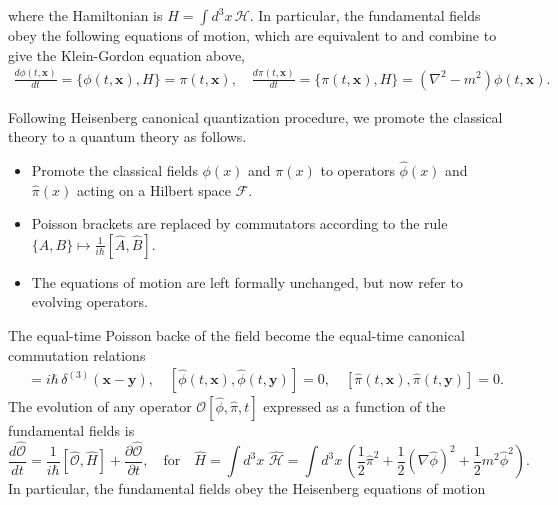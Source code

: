 \documentclass[../QFT_main.tex]{subfiles}
\begin{document}
\begin{mytheorem}
\begin{equation}
\end{equation}
where the Hamiltonian is $H = \int d^3 x\, \mathcal{H}$. 
In particular, the fundamental fields obey the following equations of motion, which are equivalent to and combine to give the Klein-Gordon equation above,
\begin{align}
    \frac{d\phi(t, \mathbf{x})}{dt} = \{\phi(t, \mathbf{x}), H\} = \pi(t, \mathbf{x}), \quad
    \frac{d\pi(t, \mathbf{x})}{dt} = \{\pi(t, \mathbf{x}), H\} = (\nabla^2 - m^2) \phi(t, \mathbf{x}). 
\end{align}
%
\end{mytheorem}


\begin{mytheorem}
%
Following Heisenberg canonical quantization procedure, we promote the classical theory to a quantum theory as follows.
\begin{itemize}
    \item Promote the classical fields $\phi(x)$ and $\pi(x)$ to operators $\hat{\phi}(x)$ and $\hat{\pi}(x)$ acting on a Hilbert space $\mathcal{F}$.
    \item Poisson brackets are replaced by commutators according to the rule $\displaystyle \{A, B\} \mapsto \frac{1}{i\hbar} [\hat{A}, \hat{B}].$
    \item The equations of motion are left formally unchanged, but now refer to evolving operators.
\end{itemize}
%
The equal-time Poisson backe of the field become the equal-time canonical commutation relations
{\small\begin{align}
    [\hat{\phi}(t, \mathbf{x}), \hat{\pi}(t, \mathbf{y})] &= i\hbar\, \delta^{(3)}(\mathbf{x} - \mathbf{y}), \quad
    [\hat{\phi}(t, \mathbf{x}), \hat{\phi}(t, \mathbf{y})] = 0, \quad
    [\hat{\pi}(t, \mathbf{x}), \hat{\pi}(t, \mathbf{y})] = 0.
\end{align}}
%
The evolution of any operator $\mathcal{O}[\hat{\phi},\hat{\pi},t]$ expressed as a function of the fundamental fields is
{\small\begin{equation}
    \frac{d\hat{\mathcal{O}}}{dt} = \frac{1}{i \hbar} [\hat{\mathcal{O}}, \hat{H}] + \frac{\partial \hat{\mathcal{O}}}{\partial t}, \quad \text{for}\quad
    \hat{H} = \int d^3x\,\, \hat{\mathcal{H}} = \int d^3 x\, \left( \frac{1}{2} \hat{\pi}^2 + \frac{1}{2} (\nabla \hat{\phi})^2 + \frac{1}{2} m^2 \hat{\phi}^2 \right).
\end{equation}}
%
In particular, the fundamental fields obey the Heisenberg equations of motion

\end{mytheorem}
\end{document}
